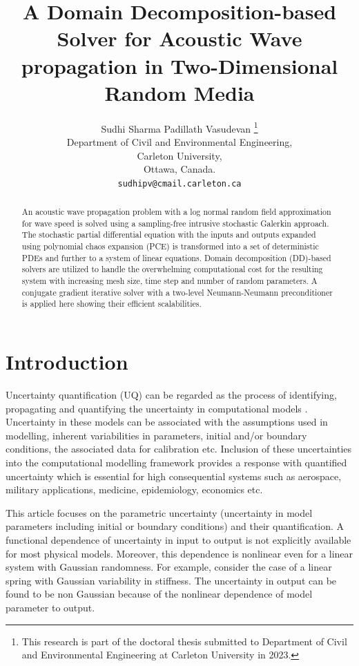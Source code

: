 \documentclass{article}
\title{A Domain Decomposition-based Solver for Acoustic Wave propagation in Two-Dimensional Random Media
}
\author{
  Sudhi Sharma Padillath Vasudevan \thanks{This research is part of the doctoral thesis submitted to Department of Civil and Environmental Engineering at Carleton University in 2023.} \\
  Department of Civil and Environmental Engineering, \\
  Carleton University,  \\
  Ottawa, Canada.\\
  \texttt{sudhipv@cmail.carleton.ca} \\
}
\begin{document}
\maketitle


\begin{abstract}
An acoustic wave propagation problem with a log normal random field approximation for wave speed is solved using a sampling-free intrusive stochastic Galerkin approach. The stochastic partial differential equation with the inputs and outputs expanded using polynomial chaos expansion (PCE) is transformed into a set of deterministic PDEs and further to a system of linear equations.  Domain decomposition (DD)-based solvers are utilized to handle the overwhelming computational cost for the resulting system with increasing mesh size, time step and number of random parameters. A conjugate gradient iterative solver with a two-level Neumann-Neumann preconditioner is applied here showing their efficient scalabilities.
\end{abstract}




\section{Introduction}

\textcolor{ss}{Uncertainty quantification (UQ) can be regarded as the process of identifying, propagating and quantifying the uncertainty in computational models \cite{book_ghanem,book_raulphsmith}. Uncertainty in these models can be associated with the assumptions used in modelling, inherent variabilities in parameters, initial and/or boundary conditions, the associated data for calibration etc. Inclusion of these uncertainties into the computational modelling framework provides a response with quantified uncertainty which is essential for high consequential systems such as aerospace, military applications, medicine, epidemiology, economics etc.}

\textcolor{ss}{This article focuses on the parametric uncertainty (uncertainty in model parameters including initial or boundary conditions) and their quantification. A functional dependence of uncertainty in input to output is not explicitly available for most physical models. Moreover, this dependence is nonlinear even for a linear system with Gaussian randomness. For example, consider the case of a linear spring with Gaussian variability in stiffness. The uncertainty in output can be found to be non Gaussian because of the nonlinear dependence of model parameter to output.}
\end{document}
